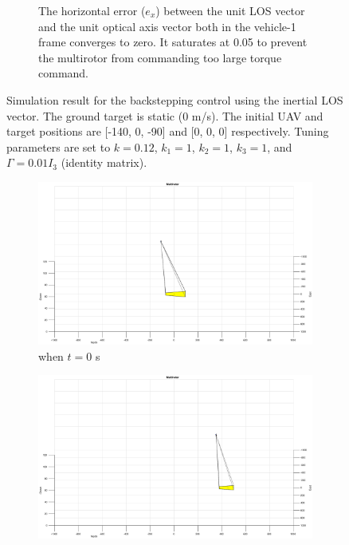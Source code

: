 \begin{figure}[htbp]
\begin{subfigure}[t]{0.8\linewidth}
		\caption{The horizontal error ($e_x$) between the unit LOS vector and the unit optical axis vector both in the vehicle-1 frame converges to zero. It saturates at 0.05 to prevent the multirotor from commanding too large torque command.}
	\end{subfigure}	
	\caption[Simulation result for the backstepping control using the inertial LOS vector.]{Simulation result for the backstepping control using the inertial LOS vector. The ground target is static (0 m/s). The initial UAV and target positions are [-140, 0, -90] and [0, 0, 0] respectively. Tuning parameters are set to $k=0.12$, $k_1=1$, $k_2=1$, $k_3=1$, and $\Gamma=0.01I_3$ (identity matrix).}
	\label{inertial_0mps}
\end{figure}

\begin{figure}[htbp]
	\centering
	\begin{subfigure}[t]{0.32\linewidth}
		\includegraphics[width=\textwidth]{images/chapter4/inertial_UAV_5mps}
		\caption{when $t=0$ s}
	\end{subfigure}
	\begin{subfigure}[t]{0.32\linewidth}
		\includegraphics[width=\textwidth]{images/chapter4/inertial_UAV_5mps_90s}

\end{subfigure}
\end{figure}
